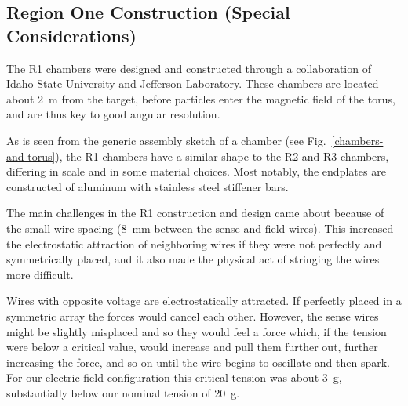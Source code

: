 \subsection{Region One Construction (Special Considerations)}

The R1 chambers were designed and constructed through a collaboration 
of Idaho State University and Jefferson Laboratory.  These 
chambers are located about 2~m from the target, 
before particles enter the magnetic field of the torus,
and are thus key to good angular resolution. 

As is seen from the generic assembly sketch of a chamber (see Fig.~\ref{chambers-and-torus}),
the R1 chambers have a similar shape to the R2 and R3 chambers, differing in
scale and in some material choices.
Most notably, the endplates are constructed of aluminum with stainless
steel stiffener bars.

The main challenges in the R1 construction and design came about because
of the small wire spacing (8~mm between the sense and field wires).  This
increased the electrostatic attraction of neighboring wires if they were
not perfectly and symmetrically placed, and it also made the physical act
of stringing the wires more difficult.

Wires with opposite voltage are electrostatically attracted.  If perfectly
placed in a symmetric array the forces would cancel each other. 
However, the sense wires might be slightly misplaced and so they would feel
a force which, if the tension were below a critical value, would increase
and pull them further out, further increasing the force, and so on until 
the wire begins to oscillate and then spark.  For our electric field configuration
this critical tension was about 3~g, substantially below our nominal
tension of 20~g.
